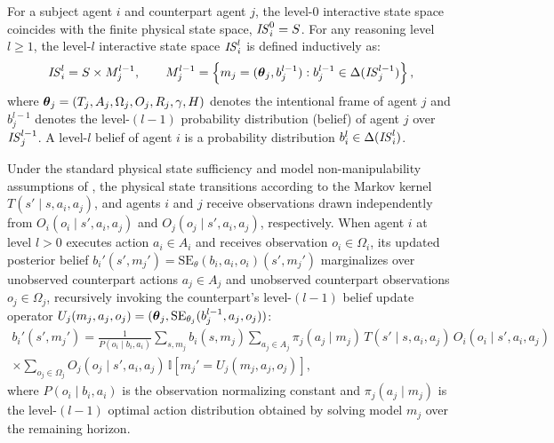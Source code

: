 \begin{definition}
  For a subject agent $i$ and counterpart agent $j$, the level-$0$ interactive state space coincides with the finite physical state space, $\mathit{IS}_i^0 = S$. For any reasoning level $l \ge 1$, the level-$l$ interactive state space $\mathit{IS}_i^l$ is defined inductively as:
  \begin{equation}
    \mathit{IS}_i^l = S \times M_j^{l-1}, \qquad M_j^{l-1} = \left\{ m_j = (\boldsymbol{\theta}_j, b_j^{l-1}) : b_j^{l-1} \in \Delta(\mathit{IS}_j^{l-1}) \right\},
    \label{eq:is_hierarchy}
  \end{equation}
  where $\boldsymbol{\theta}_j = (T_j, A_j, \Omega_j, O_j, R_j, \gamma, H)$ denotes the intentional frame of agent $j$ and $b_j^{l-1}$ denotes the level-$(l-1)$ probability distribution (belief) of agent $j$ over $\mathit{IS}_j^{l-1}$. A level-$l$ belief of agent $i$ is a probability distribution $b_i^l \in \Delta(\mathit{IS}_i^l)$.
  \label{def:is_space}
\end{definition}

Under the standard physical state sufficiency and model non-manipulability assumptions of \citet{gmytrasiewicz2005framework}, the physical state transitions according to the Markov kernel $T(s' \mid s, a_i, a_j)$, and agents $i$ and $j$ receive observations drawn independently from $O_i(o_i \mid s', a_i, a_j)$ and $O_j(o_j \mid s', a_i, a_j)$, respectively. When agent $i$ at level $l > 0$ executes action $a_i \in A_i$ and receives observation $o_i \in \Omega_i$, its updated posterior belief $b_i'(s', m_j') = \mathrm{SE}_\theta(b_i, a_i, o_i)(s', m_j')$ marginalizes over unobserved counterpart actions $a_j \in A_j$ and unobserved counterpart observations $o_j \in \Omega_j$, recursively invoking the counterpart's level-$(l-1)$ belief update operator $U_j(m_j, a_j, o_j) = (\boldsymbol{\theta}_j, \mathrm{SE}_{\theta_j}(b_j^{l-1}, a_j, o_j))$:
\begin{equation}
  \begin{aligned}
    b_i'(s', m_j') = \frac{1}{P(o_i \mid b_i, a_i)} \sum_{s, m_j} b_i(s, m_j) \sum_{a_j \in A_j} \pi_j(a_j \mid m_j) \, T(s' \mid s, a_i, a_j) \, O_i(o_i \mid s', a_i, a_j) \\
    \times \sum_{o_j \in \Omega_j} O_j(o_j \mid s', a_i, a_j) \, \mathbb{I}\!\left[m_j' = U_j(m_j, a_j, o_j)\right],
  \end{aligned}
  \label{eq:exact_se}
\end{equation}
where $P(o_i \mid b_i, a_i)$ is the observation normalizing constant and $\pi_j(a_j \mid m_j)$ is the level-$(l-1)$ optimal action distribution obtained by solving model $m_j$ over the remaining horizon.

